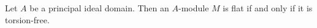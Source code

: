 Let $A$ be a principal ideal domain. Then an $A$-module $M$ is flat if and only if it is torsion-free.
